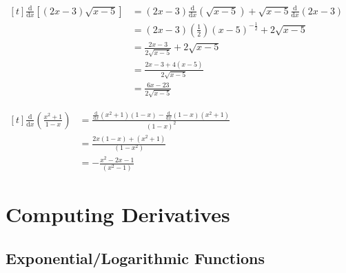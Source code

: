 \documentclass[11pt,a4paper]{book}
\begin{document}
\begin{example}
\begin{tasks}[label=(\alph*),label-width=3.5ex,after-item-skip = .5cm]
\task
$
\begin{aligned}[t]
\frac{\mathrm{d}}{\mathrm{d}x}\left[\left(2x-3\right)\sqrt{x-5}\right] & =\left(2x-3\right)\frac{\mathrm{d}}{\mathrm{d}x}\left(\sqrt{x-5}\right)+\sqrt{x-5}\frac{\mathrm{d}}{\mathrm{d}x}\left(2x-3\right)\\
 & =\left(2x-3\right)\left(\frac{1}{2}\right)\left(x-5\right)^{-\frac{1}{2}}+2\sqrt{x-5}\\
 & =\frac{2x-3}{2\sqrt{x-5}}+2\sqrt{x-5}\\
 & =\frac{2x-3+4\left(x-5\right)}{2\sqrt{x-5}}\\
 & =\frac{6x-23}{2\sqrt{x-5}}
\end{aligned}
$

\task
$
\begin{aligned}[t]
{\displaystyle \frac{\mathrm{d}}{\mathrm{d}x}\left({\displaystyle \frac{x^{2}+1}{1-x}}\right)} & =\frac{\frac{\mathrm{d}}{\mathrm{d}x}\left(x^{2}+1\right)\left(1-x\right)-\frac{\mathrm{d}}{\mathrm{d}x}\left(1-x\right)\left(x^{2}+1\right)}{\left(1-x\right)^{2}}\\
 & =\frac{2x\left(1-x\right)+\left(x^{2}+1\right)}{\left(1-x^{2}\right)}\\
 & =-\frac{x^{2}-2x-1}{\left(x^{2}-1\right)}
\end{aligned}
$

\end{tasks}

\end{example}

\newpage

\section{Computing Derivatives}

\subsection{Exponential/Logarithmic Functions}
\end{document}
